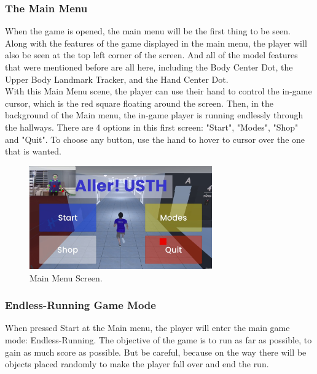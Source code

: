 \documentclass[12pt]{article}
\begin{document}
\subsubsection{The Main Menu}
\hspace*{1.5em} When the game is opened, the main menu will be the first thing to be seen.
Along with the features of the game displayed in the main menu, the player will also be seen at the top left corner of the screen. And all of the model features that were mentioned before are all here, including the Body Center Dot, the Upper Body Landmark Tracker, and the Hand Center Dot.\\

With this Main Menu scene, the player can use their hand to control the in-game cursor, which is the red square floating around the screen.
Then, in the background of the Main menu, the in-game player is running endlessly through the hallways.
There are 4 options in this first screen: "Start", "Modes", "Shop" and "Quit". To choose any button, use the hand to hover to cursor over the one that is wanted.\\

\begin{figure}[ht]
    \centering
    \includegraphics[width=0.7\textwidth]{game1.jpg}
    \caption{Main Menu Screen.}
\end{figure}

\subsubsection{Endless-Running Game Mode}
\hspace*{1.5em} When pressed Start at the Main menu, the player will enter the main game mode: Endless-Running. 
The objective of the game is to run as far as possible, to gain as much score as possible. 
But be careful, because on the way there will be objects placed randomly to make the player fall over and end the run.\\
\end{document}
